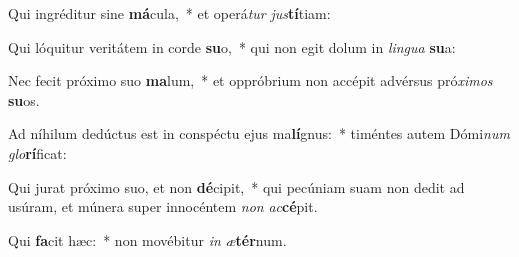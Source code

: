 \item Qui ingréditur sine \textbf{má}cula,~* et operá\textit{tur} \textit{jus}\textbf{tí}tiam:
\item Qui lóquitur veritátem in corde \textbf{su}o,~* qui non egit dolum in \textit{lin}\textit{gua} \textbf{su}a:
\item Nec fecit próximo suo \textbf{ma}lum,~* et oppróbrium non accépit advérsus pró\textit{xi}\textit{mos} \textbf{su}os.
\item Ad níhilum dedúctus est in conspéctu ejus ma\textbf{lí}gnus:~* timéntes autem Dómi\textit{num} \textit{glo}\textbf{rí}ficat:
\item Qui jurat próximo suo, et non \textbf{dé}cipit,~* qui pecúniam suam non dedit ad usúram, et múnera super innocéntem \textit{non} \textit{ac}\textbf{cé}pit.
\item Qui \textbf{fa}cit hæc:~* non movébitur \textit{in} \textit{æ}\textbf{tér}num.
